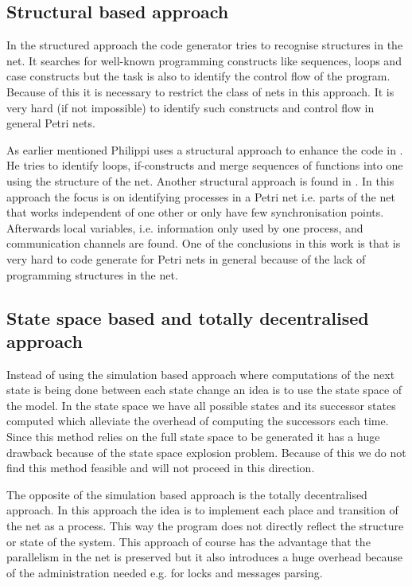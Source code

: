 \subsection{Structural based approach}
In the structured approach the code generator tries to recognise structures in the net. It searches for well-known programming constructs like sequences, loops and case constructs but the task is also to identify the control flow of the program. Because of this it is necessary to restrict the class of nets in this approach. It is very hard (if not impossible) to identify such constructs and control flow in general Petri nets.

As earlier mentioned Philippi uses a structural approach to enhance the code in \cite{RefWorks:4}. He tries to identify loops, if-constructs and merge sequences of functions into one using the structure of the net. Another structural approach is found in \cite{RefWorks:5}. In this approach the focus is on identifying processes in a Petri net i.e. parts of the net that works independent of one other or only have few synchronisation points. Afterwards local variables, i.e. information only used by one process, and communication channels are found. One of the conclusions in this work is that is very hard to code generate for Petri nets in general because of the lack of programming structures in the net.

\subsection{State space based and totally decentralised approach}
Instead of using the simulation based approach where computations of the next state is being done between each state change an idea is to use the state space of the model. In the state space we have all possible states and its successor states computed which alleviate the overhead of computing the successors each time. Since this method relies on the full state space to be generated it has a huge drawback because of the state space explosion problem. Because of this we do not find this method feasible and will not proceed in this direction.

The opposite of the simulation based approach is the totally decentralised approach. In this approach the idea is to implement each place and transition of the net as a process. This way the program does not directly reflect the structure or state of the system. This approach of course has the advantage that the parallelism in the net is preserved but it also introduces a huge overhead because of the administration needed e.g. for locks and messages parsing.